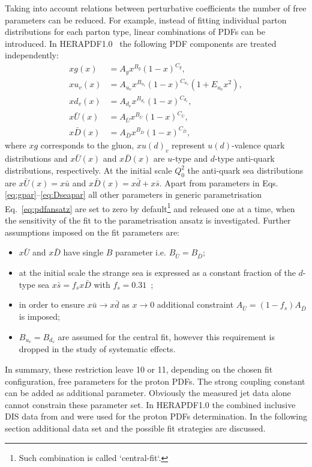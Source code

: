 Taking into account relations between perturbative coefficients the number of free parameters can be reduced. For example, instead of fitting individual parton distributions for each parton type, linear combinations of PDFs can be introduced.  In HERAPDF1.0~\cite{Aaron:2009aa} the following PDF components are treated independently:
\begin{align}
 xg\left(x\right) &= A_gx^{B_g}\left(1-x\right)^{C_g}, \label{eq:gpar} \\
 xu_v\left(x\right) &= A_{u_v}x^{B_{u_v}}\left(1-x\right)^{C_{u_v}}\left(1+E_{u_v}x^2\right),\\
 xd_v\left(x\right) &= A_{d_v}x^{B_{d_v}}\left(1-x\right)^{C_{d_v}},\\
 x\bar{U}\left(x\right) &= A_{\bar{U}}x^{B_{\bar{U}}}\left(1-x\right)^{C_{\bar{U}}},\\
 x\bar{D}\left(x\right) &= A_{\bar{D}}x^{B_{\bar{D}}}\left(1-x\right)^{C_{\bar{D}}}, \label{eq:Dseapar}
\end{align}
where $xg$ corresponds to the gluon, $xu\left(d\right)_v$ represent $u\left(d\right)$-valence quark distributions and $x\bar{U}\left(x\right)$ and $x\bar{D}\left(x\right)$ are $u$-type and $d$-type anti-quark distributions, respectively. At the initial scale $Q^2_0$ the anti-quark sea distributions are $x\bar{U}\left(x\right)=x\bar u$ and $x\bar{D}\left(x\right)=x\bar d+x\bar s$. Apart from parameters in Eqs.\eqref{eq:gpar}--\eqref{eq:Dseapar} all other parameters in generic parametrisation Eq.~\eqref{eq:pdfansatz} are set to zero by default\footnote{Such combination is called `central-fit`.} and released one at a time, when the sensitivity of the fit to the parametrisation ansatz is investigated. Further assumptions imposed on the fit parameters are:
\begin{itemize}
 \item $x\bar{U}$ and $x\bar{D}$ have single $B$ parameter i.e. $B_{\bar{U}}=B_{\bar{D}}$;
 \item at the initial scale the strange sea is expressed as a constant fraction of the $d$-type sea $x\bar s=f_s x \bar D$ with $f_s=0.31$~\cite{Martin:2009iq,Nadolsky:2008zw};
 \item in order to ensure $x\bar u \rightarrow x\bar d$ as $x\rightarrow 0$ additional constraint $A_{\bar U}=\left(1-f_s\right)A_{\bar D}$ is imposed;
 \item $B_{u_v}=B_{d_v}$ are assumed for the central fit, however this requirement is dropped in the study of systematic effects.
\end{itemize}
In summary, these restriction leave 10 or 11, depending on the chosen fit configuration, free parameters for the proton PDFs. The strong coupling constant \asz can be added as additional parameter. Obviously the measured jet data alone cannot constrain these parameter set. In HERAPDF1.0 the combined inclusive DIS data from \hone and \zeus were used for the proton PDFs determination. In the following section additional data set and the possible fit strategies are discussed.
